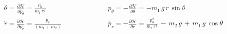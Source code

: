 \documentclass{article}
\begin{document}
\begin{align*}
\dot{\theta} = \frac{\partial \mathscr{H}}{\partial p_{\theta}} = \frac{p_{\theta}}{m_{1}\,r^{2}} \qquad&\qquad\qquad \dot{p_{\theta}} = -\frac{\partial \mathscr{H}}{\partial \theta} = -m_{1}\,g\,r\,\sin{\theta} \\
\dot{r} = \frac{\partial \mathscr{H}}{\partial p_{r}} = \frac{p_{r}}{(m_{1}+m_{2})} \qquad&\qquad\qquad \dot{p_{r}} = -\frac{\partial \mathscr{H}}{\partial r} = \frac{p_{\theta}^{2}}{m_{1}\,r^{3}} \,-\, m_{2}\,g \,+\, m_{1}\,g\,\cos{\theta} \\
\end{align*}
\end{document}
